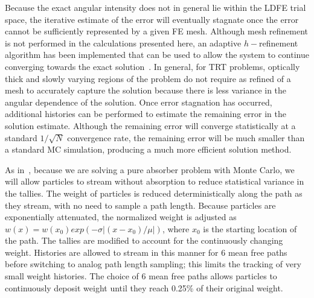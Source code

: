 \documentclass{mc2013}
\begin{document}
Because the exact angular intensity does not in general lie within the LDFE trial space, the
iterative estimate of the error will eventually stagnate once the error cannot be sufficiently
represented by a given FE mesh.  Although mesh refinement is not performed in the
calculations presented here, an adaptive $h-$refinement algorithm has been
implemented that can be used to allow the system to continue converging towards the
exact solution~\cite{jake,ans_2014}. In general, for TRT problems, optically thick and slowly varying
regions of the problem do not require as refined of a mesh to accurately capture the
solution because there is less variance in the angular dependence of the solution.
Once error stagnation has occurred, additional histories can be performed to estimate
the remaining error in the solution estimate.  Although the remaining error will
converge statistically at a standard $1/\sqrt{N}$ convergence rate, the remaining
error will be much smaller than a standard MC simulation, producing a much more
efficient solution method.



As in~\cite{park}, because we are solving a pure absorber problem with Monte Carlo, we will allow
particles to stream without absorption to reduce statistical 
variance in the tallies.  The weight of particles is reduced deterministically along
the path as they stream, with no need to sample a path length.  Because particles are exponentially attenuated, the normalized weight is
adjusted as $w(x) = w(x_0)exp(-\sigma|(x-x_0)/\mu|)$, where $x_0$ is the starting location of the path.  The tallies are modified to account
for the continuously changing weight. Histories are allowed to stream in this manner for 6 mean free paths
before switching to analog path length sampling; this limits the tracking of very small weight histories. The choice of 6 mean free paths allows particles to 
continuously deposit weight until they reach 0.25\% of their original weight.
\end{document}
